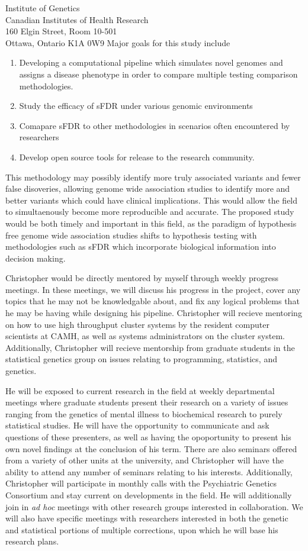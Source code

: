 \documentclass{letter}
\begin{document}
\begin{letter}{Institute of Genetics \\ Canadian Institutes of Health Research \\ 160 Elgin Street, Room 10-501 \\ Ottawa, Ontario K1A 0W9}
Major goals for this study include

\begin{enumerate}
	\item Developing a computational pipeline which simulates novel genomes and assigns a disease phenotype in order to compare multiple testing comparison methodologies. 
	\item Study the efficacy of sFDR under various genomic environments
	\item Comapare sFDR to other methodologies in scenarios often encountered by researchers
	\item Develop open source tools for release to the research community.
\end{enumerate}

This methodology may possibly identify more truly associated variants and fewer false disoveries, allowing genome wide association studies to identify more and better variants which could have clinical implications. This would allow the field to simultaenously become more reproducible and accurate. The proposed study would be both timely and important in this field, as the paradigm of hypothesis free genome wide association studies shifts to hypothesis testing with methodologies such as sFDR which incorporate biological information into decision making. 

Christopher would be directly mentored by myself through weekly progress meetings. In these meetings, we will discuss his progress in the project, cover any topics that he may not be knowledgable about, and fix any logical problems that he may be having while designing his pipeline. Christopher will recieve mentoring on how to use high throughput cluster systems by the resident computer scientists at CAMH, as well as systems administrators on the cluster system. Additionally, Christopher will recieve mentorship from graduate students in the statistical genetics group on issues relating to programming, statistics, and genetics. 

He will be exposed to current research in the field at weekly departmental meetings where graduate students present their research on a variety of issues ranging from the genetics of mental illness to biochemical research to purely statistical studies. He will have the opportunity to communicate and ask questions of these presenters, as well as having the opoportunity to present his own novel findings at the conclusion of his term.  There are also seminars offered from a variety of other units at the university, and Christopher will have the ability to attend any number of seminars relating to his interests. Additionally, Christopher will participate in monthly calls with the Psychiatric Genetics Consortium and stay current on developments in the field. He will additionally join in \textit{ad hoc} meetings with other research groups interested in collaboration. We will also have specific meetings with researchers interested in both the genetic and statistical portions of multiple corrections, upon which he will base his research plans. 


\end{letter}
\end{document}
